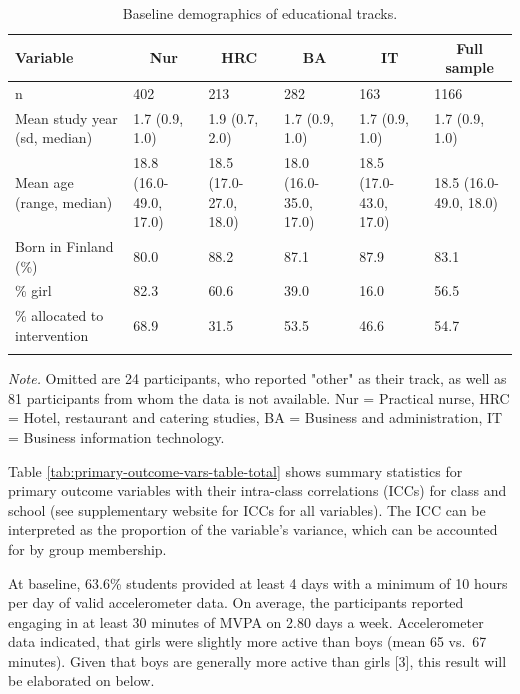 \documentclass[english,man,floatsintext]{apa6}
\begin{document}
\begin{table}[tbp]
\begin{center}
\begin{threeparttable}
\caption{\label{tab:demographics-table}Baseline demographics of educational tracks.}
\begin{tabular}{llllll}
\toprule
Variable & \multicolumn{1}{c}{Nur} & \multicolumn{1}{c}{HRC} & \multicolumn{1}{c}{BA} & \multicolumn{1}{c}{IT} & \multicolumn{1}{c}{Full sample}\\
\midrule
n & 402 & 213 & 282 & 163 & 1166\\
Mean study year (sd, median) & 1.7 (0.9, 1.0) & 1.9 (0.7, 2.0) & 1.7 (0.9, 1.0) & 1.7 (0.9, 1.0) & 1.7 (0.9, 1.0)\\
Mean age (range, median) & 18.8 (16.0-49.0, 17.0) & 18.5 (17.0-27.0, 18.0) & 18.0 (16.0-35.0, 17.0) & 18.5 (17.0-43.0, 17.0) & 18.5 (16.0-49.0, 18.0)\\
Born in Finland (\%) & 80.0 & 88.2 & 87.1 & 87.9 & 83.1\\
\% girl & 82.3 & 60.6 & 39.0 & 16.0 & 56.5\\
\% allocated to intervention & 68.9 & 31.5 & 53.5 & 46.6 & 54.7\\
\bottomrule
\addlinespace
\end{tabular}
\begin{tablenotes}[para]
\normalsize{\textit{Note.} Omitted are 24 participants, who reported "other" as their track, as well as 81 participants from whom the data is not available. Nur = Practical nurse, HRC = Hotel, restaurant and catering studies, BA = Business and administration, IT = Business information technology.}
\end{tablenotes}
\end{threeparttable}
\end{center}
\end{table}

Table \ref{tab:primary-outcome-vars-table-total} shows summary statistics for primary outcome variables with their intra-class correlations (ICCs) for class and school (see supplementary website for ICCs for all variables). The ICC can be interpreted as the proportion of the variable's variance, which can be accounted for by group membership.

At baseline, 63.6\% students provided at least 4 days with a minimum of 10 hours per day of valid accelerometer data. On average, the participants reported engaging in at least 30 minutes of MVPA on 2.80 days a week. Accelerometer data indicated, that girls were slightly more active than boys (mean 65 vs.~67 minutes). Given that boys are generally more active than girls {[}3{]}, this result will be elaborated on below.
\end{document}

